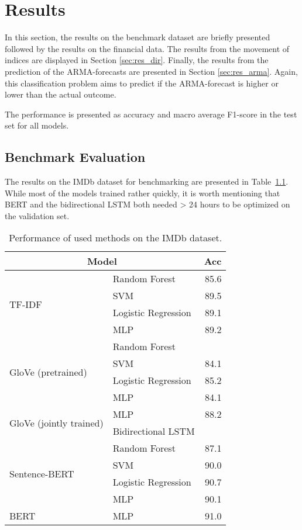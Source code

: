 \chapter{Results}

In this section, the results on the benchmark dataset are briefly presented followed by the results on the financial data.
The results from the movement of indices are displayed in Section \ref{sec:res_dir}. Finally, the results from the prediction of the ARMA-forecasts are presented in Section \ref{sec:res_arma}. Again, this classification problem aims to predict if the ARMA-forecast is higher or lower than the actual outcome. 

The performance is presented as accuracy and macro average F1-score in the test set for all models. 

\section{Benchmark Evaluation}

The results on the IMDb dataset for benchmarking are presented in Table~\ref{tab:imdb}. While most of the models trained rather quickly, it is worth mentioning that BERT and the bidirectional LSTM both needed > 24 hours to be optimized on the validation set.


\begin{table}[h]
    \centering
    \begin{tabular}{llr}
    \hline
        \multicolumn{2}{c}{\textbf{Model}} & \textbf{Acc} \\
        \hline \hline   
        \multirow{4}{*}{TF-IDF} & Random Forest & 85.6 \\
        & SVM & 89.5 \\
        & Logistic Regression & 89.1 \\
        & MLP & 89.2 \\
        \hline 
        \multirow{4}{*}{GloVe (pretrained)} & Random Forest & \\
        & SVM & 84.1 \\
        & Logistic Regression & 85.2 \\
        & MLP & 84.1 \\
        \hline 
        \multirow{2}{*}{GloVe (jointly trained)} & MLP & 88.2 \\
        & Bidirectional LSTM & \\
        \hline 
        \multirow{4}{*}{Sentence-BERT} & Random Forest & 87.1 \\
        & SVM & 90.0 \\
        & Logistic Regression & 90.7 \\
        & MLP & 90.1 \\
        \hline
        BERT & MLP & 91.0  \\
        \hline
    \end{tabular}
\caption{Performance of used methods on the IMDb dataset. }
\label{tab:imdb}
\end{table}


